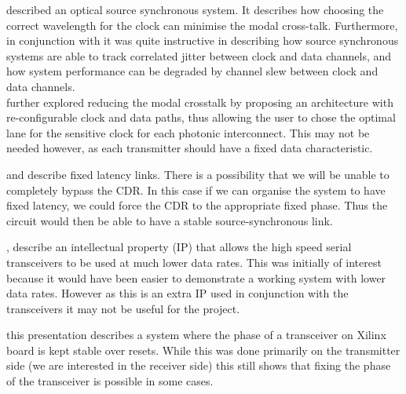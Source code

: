 \noindent \cite{williams2016source} described an optical source synchronous
system. It describes how choosing the correct wavelength for the clock can
minimise the modal cross-talk. Furthermore, in conjunction with
\cite{ragab2011receiver} it was quite instructive in describing how source
synchronous systems are able to track correlated jitter between clock and data
channels, and how system performance can be degraded by channel slew between
clock and data channels.\\ \cite{williams2019reconfiguration} further explored
reducing the modal crosstalk by proposing an architecture with re-configurable
clock and data paths, thus allowing the user to chose the optimal lane for the
sensitive clock for each photonic interconnect. This may not be needed however,
as each transmitter should have a fixed data characteristic.

\noindent \cite{chen2017optimization} and \cite{fixed_latency} describe fixed
latency links. There is a possibility that we will be unable to completely
bypass the CDR. In this case if we can organise the system to have fixed
latency, we could force the CDR to the appropriate fixed phase. Thus the
circuit would then be able to have a stable source-synchronous link.

\noindent \cite{dru_guide}, \cite{nidru} describe an intellectual property (IP)
that allows the high speed serial transceivers to be used at much lower data
rates. This was initially of interest because it would have been easier to
demonstrate a working system with lower data rates. However as this is an extra
IP used in conjunction with the transceivers it may not be useful for the
project. 

\noindent \cite{mendes_transceiver} this presentation describes a system where
the phase of a transceiver on Xilinx board is kept stable over resets. While
this was done primarily on the transmitter side (we are interested in the
receiver side) this still shows that fixing the phase of the transceiver is
possible in some cases.

